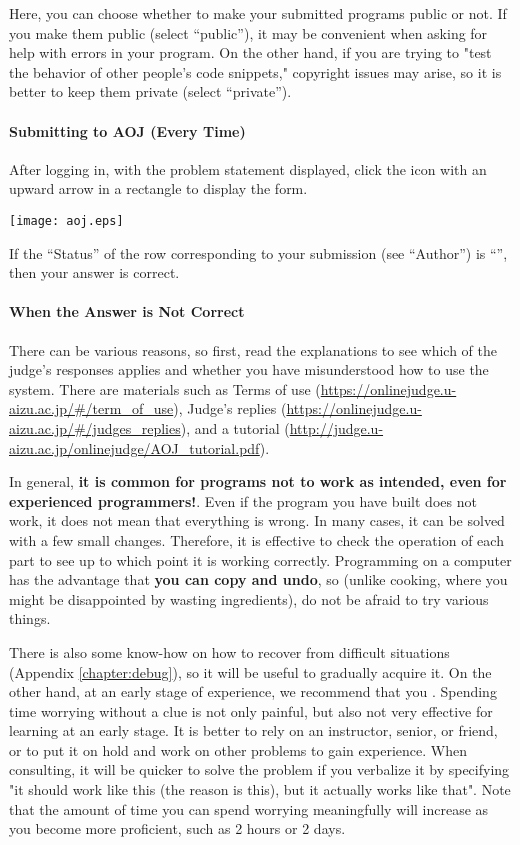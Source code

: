Here, you can choose whether to make your submitted programs public or not. If you make them public (select ``public''), it may be convenient when asking for help with errors in your program. On the other hand, if you are trying to "test the behavior of other people's code snippets," copyright issues may arise, so it is better to keep them private (select ``private'').

\paragraph{Submitting to AOJ (Every Time)}

After logging in, with the problem statement displayed, click the icon with an upward arrow in a rectangle to display the form.

\texttt{[image: aoj.eps]}

If the ``Status'' of the row corresponding to your submission (see ``Author'') is ``'', then your answer is correct.

\paragraph{When the Answer is Not Correct}

There can be various reasons, so first, read the explanations to see which of the judge's responses applies and whether you have misunderstood how to use the system.
There are materials such as Terms of use
(\url{https://onlinejudge.u-aizu.ac.jp/#/term_of_use}),
Judge's replies (\url{https://onlinejudge.u-aizu.ac.jp/#/judges_replies}),
and a tutorial (\url{http://judge.u-aizu.ac.jp/onlinejudge/AOJ_tutorial.pdf}).

In general, \textbf{it is common for programs not to work as intended, even for experienced programmers!}.
Even if the program you have built does not work, it does not mean that everything is wrong. In many cases, it can be solved with a few small changes. Therefore, it is effective to check the operation of each part to see up to which point it is working correctly.
Programming on a computer has the advantage that \textbf{you can copy and undo}, so (unlike cooking, where you might be disappointed by wasting ingredients), do not be afraid to try various things.

There is also some know-how on how to recover from difficult situations (Appendix \ref{chapter:debug}), so it will be useful to gradually acquire it.
On the other hand, at an early stage of experience, we recommend that you .
Spending time worrying without a clue is not only painful, but also not very effective for learning at an early stage. It is better to rely on an instructor, senior, or friend, or to put it on hold and work on other problems to gain experience.
When consulting, it will be quicker to solve the problem if you verbalize it by specifying "it should work like this (the reason is this), but it actually works like that".
Note that the amount of time you can spend worrying meaningfully will increase as you become more proficient, such as 2 hours or 2 days.
